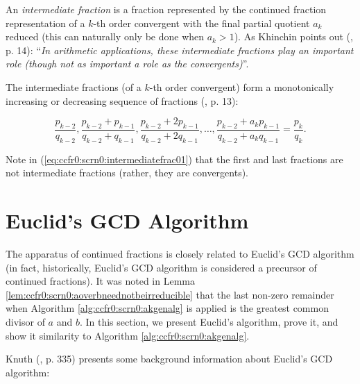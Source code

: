 An \emph{intermediate fraction} is a fraction represented
by the continued fraction representation of a $k$-th order 
convergent with the final partial quotient $a_k$ reduced
(this can naturally only be done when $a_k > 1$).  As Khinchin
points out (\cite{bibref:b:KhinchinClassic}, p. 14): 
``\emph{In arithmetic applications, these intermediate
fractions play an important role (though not as important
a role as the convergents)}''.

The intermediate fractions (of a $k$-th order convergent)
form a monotonically increasing or decreasing sequence of 
fractions (\cite{bibref:b:KhinchinClassic}, p. 13):

\begin{equation}
\label{eq:ccfr0:scrn0:intermediatefrac01}
\frac{p_{k-2}}{q_{k-2}},
\frac{p_{k-2} + p_{k-1}}{q_{k-2} + q_{k-1}},
\frac{p_{k-2} + 2 p_{k-1}}{q_{k-2} + 2 q_{k-1}},
\ldots{} ,
\frac{p_{k-2} + a_k p_{k-1}}{q_{k-2} + a_k q_{k-1}}
=
\frac{p_k}{q_k} .
\end{equation}

Note in (\ref{eq:ccfr0:scrn0:intermediatefrac01}) that the
first and last fractions are not intermediate fractions (rather, they are
convergents).

\section{Euclid's GCD Algorithm}

The apparatus of continued fractions is closely related to Euclid's GCD
algorithm (in fact, historically, Euclid's GCD algorithm is considered
a precursor of continued fractions).  It was noted in 
Lemma \ref{lem:ccfr0:scrn0:aoverbneednotbeirreducible} that the last non-zero
remainder when Algorithm \ref{alg:ccfr0:scrn0:akgenalg} is applied
is the greatest common divisor of $a$ and $b$.  In this section, we
present Euclid's algorithm, prove it, and show it similarity to
Algorithm \ref{alg:ccfr0:scrn0:akgenalg}.

Knuth (\cite{bibref:b:knuthclassic2ndedvol2}, p. 335) presents some background
information about Euclid's GCD algorithm:

